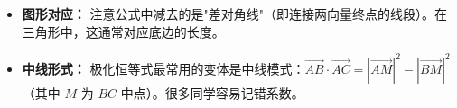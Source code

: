 \begin{trapbox}
\begin{itemize}
    \item \textbf{图形对应：} 注意公式中减去的是"差对角线"（即连接两向量终点的线段）。在三角形中，这通常对应底边的长度。
    \item \textbf{中线形式：} 极化恒等式最常用的变体是中线模式：$\vec{AB} \cdot \vec{AC} = |\vec{AM}|^2 - |\vec{BM}|^2$（其中 $M$ 为 $BC$ 中点）。很多同学容易记错系数。
\end{itemize}
\end{trapbox}